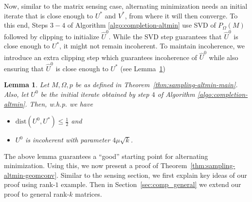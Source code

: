 \documentclass[11pt]{article}
\theoremstyle{plain}
\newtheorem{lemma}[theorem]{Lemma}
\theoremstyle{definition}
\newcommand{\dist}{\mathrm{dist}}
\begin{document}
Now, similar to the matrix sensing case, alternating minimization needs an initial iterate that is close enough to $U^*$ and $V^*$, from
where it will then converge. To this end, Steps $3-4$ of Algorithm \ref{algo:completion-altmin}  use SVD of $P_\Omega(M)$ followed by clipping to initialize $\widehat{U}^0$. While the SVD step guarantees that  $\widehat{U}^0$ is close enough to $U^*$, it might not remain incoherent. To maintain incoherence, we introduce an extra clipping step which guarantees incoherence of $\widehat{U}^0$ while also ensuring that $\widehat{U}^0$ is close enough to $U^*$ (see Lemma~\ref{lemma:svd-clipping-jointguarantee})
\begin{lemma}\label{lemma:svd-clipping-jointguarantee}
Let $M,\Omega,p$ be as defined in Theorem~\ref{thm:sampling-altmin-main}. Also, let $U^0$ be the initial iterate obtained by  step $4$ of Algorithm \ref{algo:completion-altmin}. Then, w.h.p. we have%
\begin{itemize}\setlength{\topsep}{-5pt}\setlength{\itemsep}{-5pt}
  \item	$\dist\left(U^{0},U^*\right) \leq \frac{1}{2}$ and
  \item	$U^{0}$ is incoherent with parameter $4\mu \sqrt{k}$.
\end{itemize}
\end{lemma}
The above lemma guarantees a ``good'' starting point for alternating minimization. Using this, we now present a proof of Theorem~\ref{thm:sampling-altmin-geomconv}.  %
Similar to the sensing section, we first explain key ideas of our proof using rank-$1$ example. Then in Section~\ref{sec:comp_general} we extend our proof to  general rank-$k$ matrices. 
\end{document}
